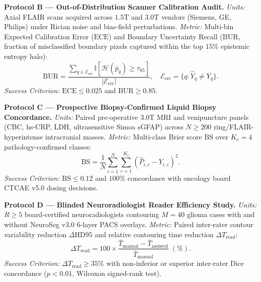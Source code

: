 \documentclass[conference]{IEEEtran}
\begin{document}
\textbf{Protocol B --- Out-of-Distribution Scanner Calibration Audit.} \textit{Units:} Axial FLAIR scans acquired across $1.5\text{T}$ and $3.0\text{T}$ vendors (Siemens, GE, Philips) under Rician noise and bias-field perturbations. \textit{Metric:} Multi-bin Expected Calibration Error ($\text{ECE}$) and Boundary Uncertainty Recall ($\text{BUR}$, fraction of misclassified boundary pixels captured within the top $15\%$ epistemic entropy halo):
\begin{equation}
    \text{BUR} = \frac{\sum_{q \in \mathcal{E}_{\text{err}}} \mathbb{I}\!\left[\mathcal{H}(\bar{p}_q) \ge \tau_{85}\right]}{|\mathcal{E}_{\text{err}}|}, \quad \mathcal{E}_{\text{err}} = \{q : \hat{Y}_q \neq Y_q\}.
    \label{eq:prot_b}
\end{equation}
\textit{Success Criterion:} $\text{ECE} \le 0.025$ and $\text{BUR} \ge 0.85$.

\textbf{Protocol C --- Prospective Biopsy-Confirmed Liquid Biopsy Concordance.} \textit{Units:} Paired pre-operative 3.0T MRI and venipuncture panels (CBC, hs-CRP, LDH, ultrasensitive Simoa sGFAP) across $N \ge 200$ ring/FLAIR-hyperintense intracranial masses. \textit{Metric:} Multi-class Brier score $\text{BS}$ over $K_c = 4$ pathology-confirmed classes:
\begin{equation}
    \text{BS} = \frac{1}{N}\sum_{i=1}^{N}\sum_{c=1}^{K_c}\!\left(\hat{P}_{i,c} - Y_{i,c}\right)^2.
    \label{eq:prot_c}
\end{equation}
\textit{Success Criterion:} $\text{BS} \le 0.12$ and $100\%$ concordance with oncology board CTCAE v5.0 dosing decisions.

\textbf{Protocol D --- Blinded Neuroradiologist Reader Efficiency Study.} \textit{Units:} $R \ge 5$ board-certified neuroradiologists contouring $M = 40$ glioma cases with and without NeuroSeg v3.0 6-layer PACS overlays. \textit{Metric:} Paired inter-rater contour variability reduction $\Delta\text{HD95}$ and relative contouring time reduction $\Delta T_{\text{read}}$:
\begin{equation}
    \Delta T_{\text{read}} = 100 \times \frac{\bar{T}_{\text{manual}} - \bar{T}_{\text{assisted}}}{\bar{T}_{\text{manual}}}\;(\%).
    \label{eq:prot_d}
\end{equation}
\textit{Success Criterion:} $\Delta T_{\text{read}} \ge 35\%$ with non-inferior or superior inter-rater Dice concordance ($p < 0.01$, Wilcoxon signed-rank test).

\appendices
\end{document}
